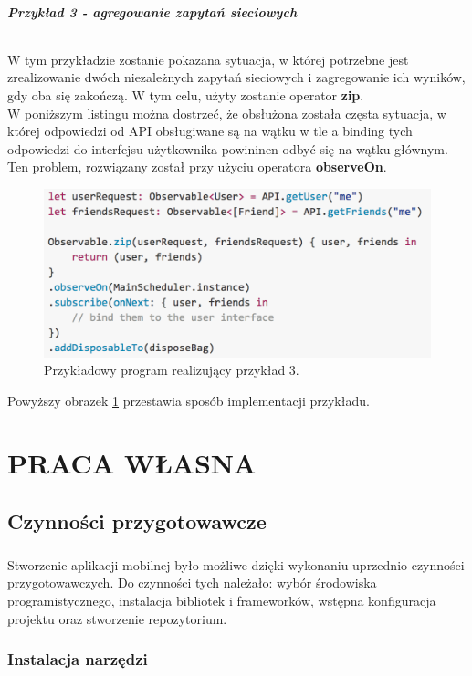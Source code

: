 \documentclass[12pt,oneside,a4paper]{report}
\begin{document}
\paragraph{Przykład 3 - agregowanie zapytań sieciowych}
\subparagraph{}W tym przykładzie zostanie pokazana sytuacja, w której potrzebne jest zrealizowanie dwóch niezależnych zapytań sieciowych i zagregowanie ich wyników, gdy oba się zakończą. W tym celu, użyty zostanie operator \textbf{zip}.\\
W poniższym listingu można dostrzeć, że obsłużona została częsta sytuacja, w której odpowiedzi od API obsługiwane są na wątku w tle a binding tych odpowiedzi do interfejsu użytkownika powininen odbyć się na wątku głównym. Ten problem, rozwiązany został przy użyciu operatora \textbf{observeOn}.
\begin{figure}[ht!]
	\centering
	\includegraphics[width=14cm]{aggregatingNetworkRequests}
	\caption{Przykładowy program realizujący przykład 3.\cite{transientState}}
	\label{aggregatingNetworkRequests}
\end{figure}
Powyższy obrazek \ref{aggregatingNetworkRequests} przestawia sposób implementacji przykładu.
\chapter{PRACA WŁASNA}
\section{Czynności przygotowawcze}		
\paragraph{}Stworzenie aplikacji mobilnej było możliwe dzięki wykonaniu uprzednio czynności przygotowawczych. Do czynności tych należało: wybór środowiska programistycznego, instalacja bibliotek i frameworków, wstępna konfiguracja projektu oraz stworzenie repozytorium.
\subsection{Instalacja narzędzi}
\end{document}
